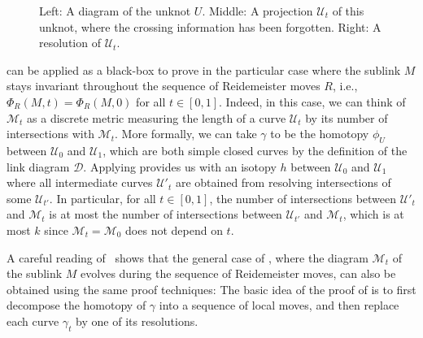\documentclass[10pt,a4paper]{amsart}
\newcommand{\control}[2]{ ($#2+#1$) .. #1}
\begin{document}
\begin{figure}[ht]
\begin{center}
\caption{Left: A diagram of the unknot $U$. Middle: A projection $\mathcal{U}_t$ of this unknot, where the crossing information has been forgotten. Right: A resolution of $\mathcal{U}_t$.}
\label{pic_resolution}
\end{center}
\end{figure}

 can be applied as a black-box to prove  in the particular case where the sublink $M$ stays invariant throughout the sequence of Reidemeister moves $R$, i.e., $\Phi_R(M,t)=\Phi_R(M,0)$ for all $t \in [0,1]$. Indeed, in this case, we can think of $\mathcal{M}_t$ as a discrete metric measuring the length of a curve $\mathcal{U}_t$ by its number of intersections with $\mathcal{M}_t$. More formally, we can take $\gamma$ to be the homotopy $\phi_U$ between $\mathcal{U}_0$ and $\mathcal{U}_1$, which are both simple closed curves by the definition of the link diagram $\mathcal{D}$. Applying  provides us with an isotopy $h$ between $\mathcal{U}_0$ and $\mathcal{U}_1$ where all intermediate curves $\mathcal{U}'_t$ are obtained from resolving intersections of some $\mathcal{U}_{t'}$. In particular, for all $t \in [0,1]$, the number of intersections between $\mathcal{U}'_t$ and $\mathcal{M}_t$ is at most the number of intersections between $\mathcal{U}_{t'}$ and $\mathcal{M}_t$, which is at most $k$ since $\mathcal{M}_t=\mathcal{M}_0$ does not depend on $t$.

A careful reading of~\cite{Chambers_homo-isotopy} shows that the general case of , where the diagram $\mathcal{M}_t$ of the sublink $M$ evolves during the sequence of Reidemeister moves, can also be obtained using the same proof techniques: The basic idea of the proof of  is to first decompose the homotopy of $\gamma$ into a sequence of local moves, and then replace each curve $\gamma_t$ by one of its resolutions.
\end{document}
